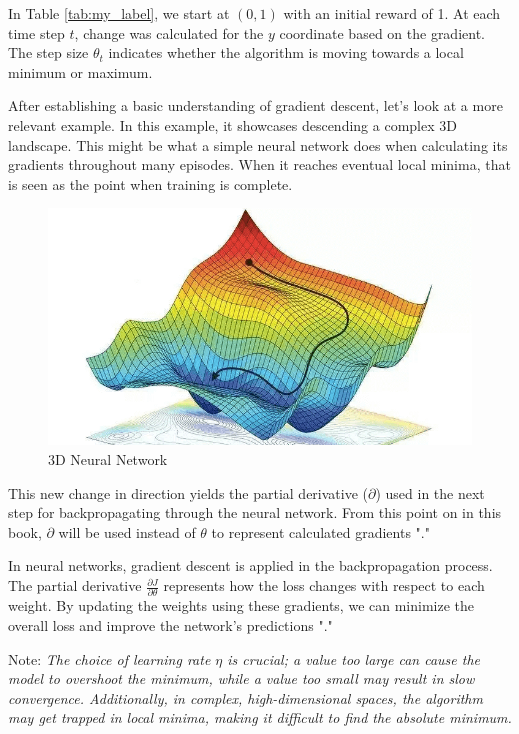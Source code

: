 In Table \ref{tab:my_label}, we start at $(0, 1)$ with an initial reward of 1. At each time step $t$, change was calculated for the $y$ coordinate based on the gradient. The step size $\theta_t$ indicates whether the algorithm is moving towards a local minimum or maximum.

After establishing a basic understanding of gradient descent, let's look at a more relevant example. In this example, it showcases descending a complex 3D landscape. This might be what a simple neural network does when calculating its gradients throughout many episodes. When it reaches eventual local minima, that is seen as the point when training is complete.

\begin{figure}[H]
    \centering
    \includegraphics[width=0.75\linewidth]{images/IansColorGraph.png}
    \caption{3D Neural Network}
    \label{fig:3dneuralnetwork}
\end{figure}

This new change in direction yields the partial derivative ($\partial$) used in the next step for backpropagating through the neural network. From this point on in this book, $\partial$ will be used instead of $\theta$ to represent calculated gradients "\cite{3b1b_2}."

In neural networks, gradient descent is applied in the backpropagation process. The partial derivative $\frac{\partial J}{\partial \theta}$ represents how the loss changes with respect to each weight. By updating the weights using these gradients, we can minimize the overall loss and improve the network's predictions "\cite{3b1b_2}."

Note: \textit{The choice of learning rate $\eta$ is crucial; a value too large can cause the model to overshoot the minimum, while a value too small may result in slow convergence. Additionally, in complex, high-dimensional spaces, the algorithm may get trapped in local minima, making it difficult to find the absolute minimum.}

